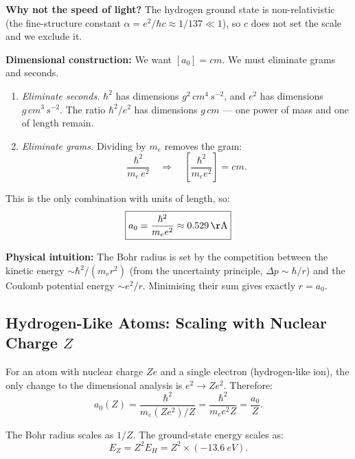 \textbf{Why not the speed of light?}  The hydrogen ground state is
non-relativistic (the fine-structure constant $\alpha = e^2/\hbar c \approx
1/137 \ll 1$), so $c$ does not set the scale and we exclude it.

\textbf{Dimensional construction:}
We want $[a_0] = \si{cm}$.  We must eliminate grams and seconds.

\begin{enumerate}
    \item \emph{Eliminate seconds.}  $\hbar^2$ has dimensions
    $\si{g^2\,cm^4\,s^{-2}}$, and $e^2$ has dimensions
    $\si{g\,cm^3\,s^{-2}}$.  The ratio $\hbar^2/e^2$ has dimensions
    $\si{g\,cm}$ — one power of mass and one of length remain.

    \item \emph{Eliminate grams.}  Dividing by $m_e$ removes the gram:
    \[
        \frac{\hbar^2}{m_e\, e^2} \quad \Rightarrow \quad
        \left[\frac{\hbar^2}{m_e e^2}\right] = \si{cm}.
    \]
\end{enumerate}

This is the only combination with units of length, so:
\begin{equation}
    \boxed{a_0 = \frac{\hbar^2}{m_e e^2} \approx \SI{0.529}{\AA}}
    \label{eq:lec04:bohr_radius}
\end{equation}

\noindent\textbf{Physical intuition:} The Bohr radius is set by the competition between
the kinetic energy $\sim \hbar^2/(m_e r^2)$ (from the uncertainty principle,
$\Delta p \sim \hbar/r$) and the Coulomb potential energy $\sim e^2/r$.
Minimising their sum gives exactly $r = a_0$.

\subsection{Hydrogen-Like Atoms: Scaling with Nuclear Charge $Z$}

For an atom with nuclear charge $Ze$ and a single electron (hydrogen-like
ion), the only change to the dimensional analysis is $e^2 \to Ze^2$.  Therefore:
\begin{equation}
    a_0(Z) = \frac{\hbar^2}{m_e (Ze^2)/Z} = \frac{\hbar^2}{m_e e^2 Z}
    = \frac{a_0}{Z}.
    \label{eq:lec04:bohr_Z}
\end{equation}

The Bohr radius scales as $1/Z$.  The ground-state energy scales as:
\[
    E_Z = Z^2 E_H = Z^2 \times (\SI{-13.6}{eV}).
\]


